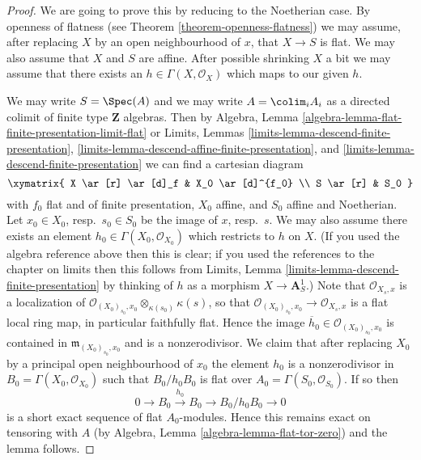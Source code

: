 \begin{proof}
We are going to prove this by reducing to the Noetherian case.
By openness of flatness (see
Theorem \ref{theorem-openness-flatness})
we may assume, after replacing $X$ by an
open neighbourhood of $x$, that $X \to S$ is flat.
We may also assume that $X$ and $S$ are affine.
After possible shrinking $X$ a bit we may assume that there exists
an $h \in \Gamma(X, \mathcal{O}_X)$ which maps to our given $h$.

\medskip\noindent
We may write $S = \Spec(A)$ and we may write $A = \colim_i A_i$
as a directed colimit of finite type $\mathbf{Z}$ algebras.
Then by
Algebra, Lemma \ref{algebra-lemma-flat-finite-presentation-limit-flat}
or
Limits, Lemmas \ref{limits-lemma-descend-finite-presentation},
\ref{limits-lemma-descend-affine-finite-presentation}, and
\ref{limits-lemma-descend-finite-presentation}
we can find a cartesian diagram
$$
\xymatrix{
X \ar[r] \ar[d]_f & X_0 \ar[d]^{f_0} \\
S \ar[r] & S_0
}
$$
with $f_0$ flat and of finite presentation, $X_0$ affine, and
$S_0$ affine and Noetherian. Let $x_0 \in X_0$, resp.\ $s_0 \in S_0$
be the image of $x$, resp.\ $s$. We may also assume there exists an element
$h_0 \in \Gamma(X_0, \mathcal{O}_{X_0})$ which restricts to $h$ on $X$.
(If you used the algebra reference above then this is clear; if you used
the references to the chapter on limits then this follows from
Limits, Lemma \ref{limits-lemma-descend-finite-presentation}
by thinking of $h$ as a morphism $X \to \mathbf{A}^1_S$.)
Note that $\mathcal{O}_{X_s, x}$ is a localization of
$\mathcal{O}_{(X_0)_{s_0}, x_0} \otimes_{\kappa(s_0)} \kappa(s)$, so that
$\mathcal{O}_{(X_0)_{s_0}, x_0} \to \mathcal{O}_{X_s, x}$ is a flat
local ring map, in particular faithfully flat. Hence the image
$\overline{h}_0 \in \mathcal{O}_{(X_0)_{s_0}, x_0}$
is contained in $\mathfrak m_{(X_0)_{s_0}, x_0}$ and is a nonzerodivisor.
We claim that after replacing $X_0$ by a principal open neighbourhood of
$x_0$ the element $h_0$ is a nonzerodivisor in
$B_0 = \Gamma(X_0, \mathcal{O}_{X_0})$ such that $B_0/h_0B_0$ is flat
over $A_0 = \Gamma(S_0, \mathcal{O}_{S_0})$.
If so then
$$
0 \to B_0 \xrightarrow{h_0} B_0 \to B_0/h_0B_0 \to 0
$$
is a short exact sequence of flat $A_0$-modules. Hence this remains exact
on tensoring with $A$ (by
Algebra, Lemma \ref{algebra-lemma-flat-tor-zero})
and the lemma follows.


\end{proof}
